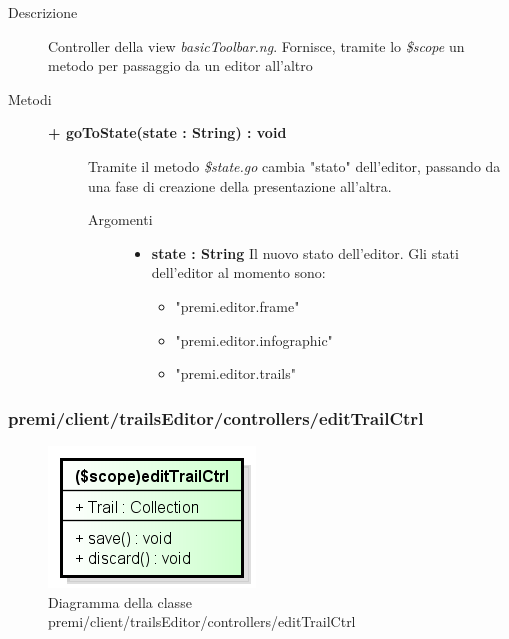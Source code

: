\begin{description}
\item[Descrizione] \hfill
	Controller della view \textit{basicToolbar.ng}. Fornisce, tramite lo \textit{\$scope} un metodo per passaggio da un editor all'altro
	
\item[Metodi] \hfill

	\begin{description}
		\item[\textbf{\color{blue}+ goToState(state : String) : void			}] \hfill
			Tramite il metodo \textit{\$state.go} cambia "stato" dell'editor, passando da una fase di creazione della presentazione all'altra.
			
		\begin{description}
			\item[Argomenti] \hfill
				\begin{itemize}
				
					\item \textbf{state : String			} \hfill
					Il nuovo stato dell'editor. Gli stati dell'editor al momento sono:
					\begin{itemize}
						\item "premi.editor.frame"
						\item "premi.editor.infographic"
						\item "premi.editor.trails"
					\end{itemize}
					
				\end{itemize}
		\end{description}
	\end{description}
		
\end{description}



\subsubsection{premi/client/trailsEditor/controllers/editTrailCtrl}
\begin{figure}[h]
\begin{center}
\includegraphics[scale=0.55]{img/diacla/editTrailCtrl.png}
\caption{Diagramma della classe premi/client/trailsEditor/controllers/editTrailCtrl}
\end{center}
\end{figure}


